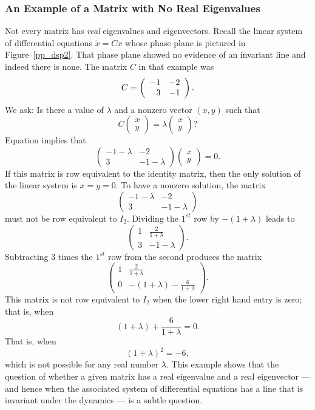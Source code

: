 \subsubsection*{An Example of a Matrix with No Real Eigenvalues}

Not every matrix has {\em real\/} eigenvalues and
eigenvectors.  Recall the linear system of differential 
equations $\dot{x}=Cx$ whose phase plane is pictured in Figure~\ref{pp_dsp2}.  
That phase plane showed no evidence of an invariant line and indeed there is 
none.  The matrix $C$ in that example was
\[
C=\left(\begin{array}{rr} -1 & -2\\ 3 &-1\end{array}\right).
\]
We ask: Is there a value of $\lambda$ and a nonzero vector
$(x,y)$ such that
\begin{equation}  \label{E:eigexamp}
C\left(\begin{array}{c} x\\y\end{array}\right) =
\lambda  \left(\begin{array}{c} x\\y\end{array}\right)?
\end{equation}
Equation  implies that
\[
\left(\begin{array}{cc} -1-\lambda & -2 \\ 3 & -1-\lambda
\end{array}\right) \left(\begin{array}{c}
x\\y\end{array}\right) =0.
\]
If this matrix is row equivalent to the identity matrix, then
the only solution of the linear system is $x=y=0$.  To have a
nonzero solution, the matrix
\[
\left(\begin{array}{cc} -1-\lambda & -2 \\ 3 & -1-\lambda
\end{array}\right)
\]
must not be row equivalent to $I_2$.  Dividing the $1^{st}$ row by
$-(1+\lambda)$ leads to
\[
\left(\begin{array}{cc} 1 & \frac{2}{1+\lambda} \\ 3 & -1-\lambda
\end{array}\right).
\]
Subtracting $3$ times the $1^{st}$ row from the second produces
the matrix
\[
\left(\begin{array}{cc} 1 & \frac{2}{1+\lambda} \\ 0 &
-(1+\lambda) - \frac{6}{1+\lambda}
\end{array}\right).
\]
This matrix is not row equivalent to $I_2$ when the lower
right hand entry is zero; that is, when
\[
(1+\lambda) +\frac{6}{1+\lambda} = 0.
\]
That is, when
\[
(1+\lambda)^2 = -6,
\]
which is not possible for any real number $\lambda$.  This
example shows that the question of whether a given matrix has a
real eigenvalue and a real eigenvector --- and hence when the
associated system of differential equations has a line that is
invariant under the dynamics --- is a subtle question.


